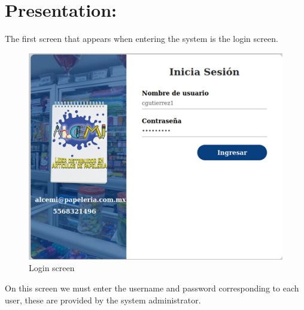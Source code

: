 \documentclass{article}
\begin{document}
\section{Presentation:}

The first screen that appears when entering the system is the login screen.\\

\begin{figure}[h]
\caption {Login screen}
\centering
\includegraphics[scale=1]{fig3}
\end{figure}

On this screen we must enter the username and password corresponding to each user, these are provided by the system administrator.\\

\pagebreak
\end{document}
